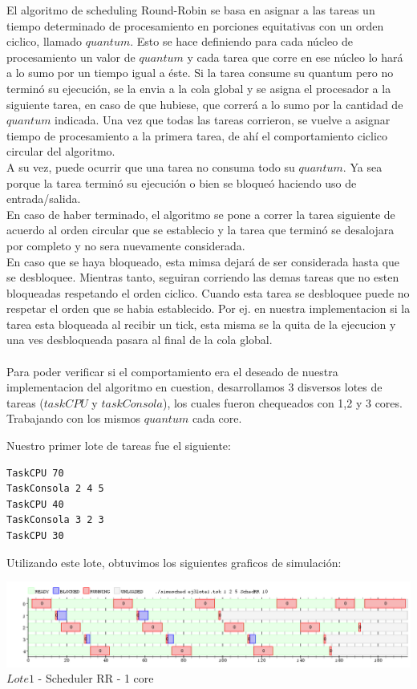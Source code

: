 \indent El algoritmo de scheduling Round-Robin se basa en asignar a las tareas un tiempo determinado de procesamiento en porciones equitativas  con un orden ciclico, llamado
$quantum$. 
Esto se hace definiendo para cada núcleo de procesamiento un valor de $quantum$ y cada tarea que corre en ese núcleo lo hará a lo sumo por un tiempo igual a éste. 
Si la tarea consume su quantum pero no terminó su ejecución, se la envia a la cola global y se asigna el procesador a la siguiente tarea, en 
caso de que hubiese, que correrá a lo sumo por la cantidad de $quantum$ indicada. 
Una vez que todas las tareas corrieron, se vuelve a asignar tiempo de procesamiento a la primera tarea, 
de ahí el comportamiento ciclico circular del algoritmo.\\
\indent A su vez, puede ocurrir que una tarea no consuma todo su $quantum$. Ya sea porque 
la tarea terminó su ejecución o bien se bloqueó haciendo uso de entrada/salida.\\
\indent En caso de haber terminado, el algoritmo se pone a correr la tarea siguiente de acuerdo al orden circular que se 
establecio y la tarea que terminó se desalojara por completo y no sera nuevamente considerada.\\
\indent En caso que se haya bloqueado, esta mimsa dejará de ser considerada hasta que se desbloquee. Mientras tanto,
seguiran corriendo las demas tareas que no esten bloqueadas respetando el orden ciclico.
Cuando esta tarea se desbloquee puede no respetar el orden que se habia establecido. Por ej. en nuestra implementacion
si la tarea esta bloqueada al recibir un tick, esta misma se la quita de la ejecucion y una ves desbloqueada pasara al final de
la cola global.\\
\\
\indent Para poder verificar si el comportamiento era el deseado de nuestra implementacion del algoritmo en cuestion, 
desarrollamos 3 disversos lotes de tareas ($taskCPU$ y $taskConsola$), los cuales fueron chequeados con 1,2 y 3 cores.\\
Trabajando con los mismos $quantum$ cada core.
\indent

Nuestro primer lote de tareas fue el siguiente:
\begin{verbatim}
TaskCPU 70
TaskConsola 2 4 5
TaskCPU 40
TaskConsola 3 2 3
TaskCPU 30
\end{verbatim}

Utilizando este lote, obtuvimos los siguientes graficos de simulación:\\
\begin{center}

    
	\includegraphics[width=450pt]{./EJ4_RR/ejercicio4-1nucleo.png}
	{$Lote 1$ - Scheduler RR - 1 core}	
 
\end{center}


